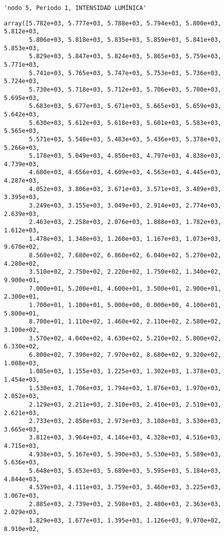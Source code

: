 \documentclass[11pt]{article}
\begin{document}
    
    
    \begin{verbatim}
'nodo 5, Periodo 1, INTENSIDAD LUMÍNICA'
    \end{verbatim}

    
    
    \begin{verbatim}
array([5.782e+03, 5.777e+03, 5.788e+03, 5.794e+03, 5.800e+03, 5.812e+03,
       5.806e+03, 5.818e+03, 5.835e+03, 5.859e+03, 5.841e+03, 5.853e+03,
       5.829e+03, 5.847e+03, 5.824e+03, 5.865e+03, 5.759e+03, 5.771e+03,
       5.741e+03, 5.765e+03, 5.747e+03, 5.753e+03, 5.736e+03, 5.724e+03,
       5.730e+03, 5.718e+03, 5.712e+03, 5.706e+03, 5.700e+03, 5.695e+03,
       5.683e+03, 5.677e+03, 5.671e+03, 5.665e+03, 5.659e+03, 5.642e+03,
       5.630e+03, 5.612e+03, 5.618e+03, 5.601e+03, 5.583e+03, 5.565e+03,
       5.571e+03, 5.548e+03, 5.483e+03, 5.436e+03, 5.378e+03, 5.266e+03,
       5.178e+03, 5.049e+03, 4.850e+03, 4.797e+03, 4.838e+03, 4.739e+03,
       4.680e+03, 4.656e+03, 4.609e+03, 4.563e+03, 4.445e+03, 4.287e+03,
       4.052e+03, 3.806e+03, 3.671e+03, 3.571e+03, 3.489e+03, 3.395e+03,
       3.249e+03, 3.155e+03, 3.049e+03, 2.914e+03, 2.774e+03, 2.639e+03,
       2.463e+03, 2.258e+03, 2.076e+03, 1.888e+03, 1.782e+03, 1.612e+03,
       1.478e+03, 1.348e+03, 1.260e+03, 1.167e+03, 1.073e+03, 9.670e+02,
       8.560e+02, 7.680e+02, 6.860e+02, 6.040e+02, 5.270e+02, 4.280e+02,
       3.510e+02, 2.750e+02, 2.220e+02, 1.750e+02, 1.340e+02, 9.900e+01,
       7.000e+01, 5.200e+01, 4.600e+01, 3.500e+01, 2.900e+01, 2.300e+01,
       1.700e+01, 1.100e+01, 5.000e+00, 0.000e+00, 4.100e+01, 5.800e+01,
       8.700e+01, 1.110e+02, 1.460e+02, 2.110e+02, 2.580e+02, 3.100e+02,
       3.570e+02, 4.040e+02, 4.630e+02, 5.210e+02, 5.800e+02, 6.330e+02,
       6.800e+02, 7.390e+02, 7.970e+02, 8.680e+02, 9.320e+02, 1.008e+03,
       1.085e+03, 1.155e+03, 1.225e+03, 1.302e+03, 1.378e+03, 1.454e+03,
       1.530e+03, 1.706e+03, 1.794e+03, 1.876e+03, 1.970e+03, 2.052e+03,
       2.129e+03, 2.211e+03, 2.310e+03, 2.410e+03, 2.510e+03, 2.621e+03,
       2.733e+03, 2.850e+03, 2.973e+03, 3.108e+03, 3.530e+03, 3.665e+03,
       3.812e+03, 3.964e+03, 4.146e+03, 4.328e+03, 4.516e+03, 4.715e+03,
       4.938e+03, 5.167e+03, 5.390e+03, 5.530e+03, 5.589e+03, 5.636e+03,
       5.648e+03, 5.653e+03, 5.689e+03, 5.595e+03, 5.184e+03, 4.844e+03,
       4.539e+03, 4.111e+03, 3.759e+03, 3.460e+03, 3.225e+03, 3.067e+03,
       2.885e+03, 2.739e+03, 2.598e+03, 2.480e+03, 2.363e+03, 2.029e+03,
       1.829e+03, 1.677e+03, 1.395e+03, 1.126e+03, 9.970e+02, 8.910e+02,

\end{verbatim}
\end{document}
